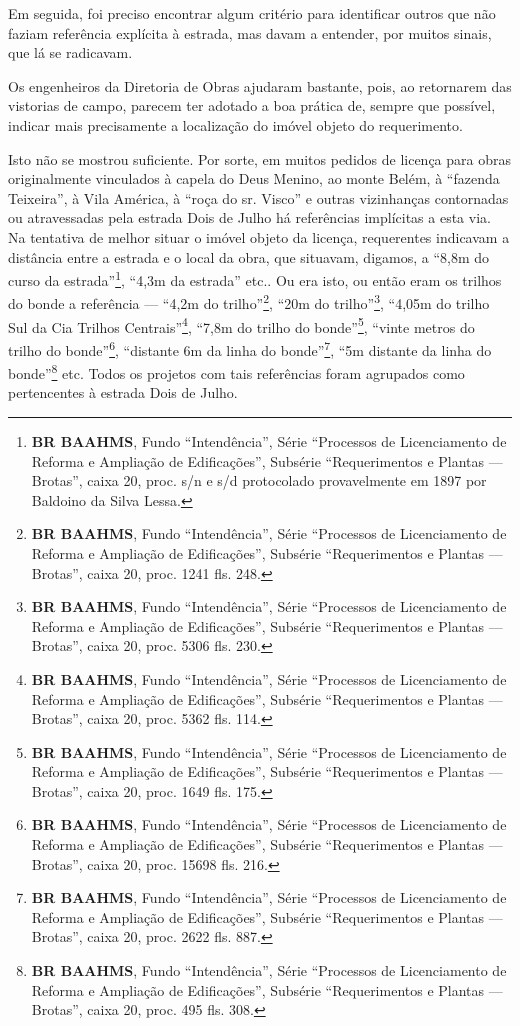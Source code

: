 Em seguida, foi preciso encontrar algum critério para identificar outros que não faziam referência explícita à estrada, mas davam a entender, por muitos sinais, que lá se radicavam. 

Os engenheiros da Diretoria de Obras ajudaram bastante, pois, ao retornarem das vistorias de campo, parecem ter adotado a boa prática de, sempre que possível, indicar mais precisamente a localização do imóvel objeto do requerimento. 

Isto não se mostrou suficiente. Por sorte, em muitos pedidos de licença para obras originalmente vinculados à capela do Deus Menino, ao monte Belém, à ``fazenda Teixeira'', à Vila América, à ``roça do sr. Visco'' e outras vizinhanças contornadas ou atravessadas pela estrada Dois de Julho há referências implícitas a esta via. Na tentativa de melhor situar o imóvel objeto da licença, requerentes indicavam a distância entre a estrada e o local da obra, que situavam, digamos, a ``8,8m do curso da estrada''\footnote{\textbf{BR BAAHMS}, Fundo ``Intendência'', Série ``Processos de Licenciamento de Reforma e Ampliação de Edificações'', Subsérie ``Requerimentos e Plantas --- Brotas'', caixa 20, proc. s/n e s/d protocolado provavelmente em 1897 por Baldoino da Silva Lessa.}, ``4,3m da estrada'' etc.. Ou era isto, ou então eram os trilhos do bonde a referência --- ``4,2m do trilho''\footnote{\textbf{BR BAAHMS}, Fundo ``Intendência'', Série ``Processos de Licenciamento de Reforma e Ampliação de Edificações'', Subsérie ``Requerimentos e Plantas --- Brotas'', caixa 20, proc. 1241 fls. 248.}, ``20m do trilho''\footnote{\textbf{BR BAAHMS}, Fundo ``Intendência'', Série ``Processos de Licenciamento de Reforma e Ampliação de Edificações'', Subsérie ``Requerimentos e Plantas --- Brotas'', caixa 20, proc. 5306 fls. 230.}, ``4,05m do trilho Sul da Cia Trilhos Centrais''\footnote{\textbf{BR BAAHMS}, Fundo ``Intendência'', Série ``Processos de Licenciamento de Reforma e Ampliação de Edificações'', Subsérie ``Requerimentos e Plantas --- Brotas'', caixa 20, proc. 5362 fls. 114.}, ``7,8m do trilho do bonde''\footnote{\textbf{BR BAAHMS}, Fundo ``Intendência'', Série ``Processos de Licenciamento de Reforma e Ampliação de Edificações'', Subsérie ``Requerimentos e Plantas --- Brotas'', caixa 20, proc. 1649 fls. 175.}, ``vinte metros do trilho do bonde''\footnote{\textbf{BR BAAHMS}, Fundo ``Intendência'', Série ``Processos de Licenciamento de Reforma e Ampliação de Edificações'', Subsérie ``Requerimentos e Plantas --- Brotas'', caixa 20, proc. 15698 fls. 216.}, ``distante 6m da linha do bonde''\footnote{\textbf{BR BAAHMS}, Fundo ``Intendência'', Série ``Processos de Licenciamento de Reforma e Ampliação de Edificações'', Subsérie ``Requerimentos e Plantas --- Brotas'', caixa 20, proc. 2622 fls. 887.}, ``5m distante da linha do bonde''\footnote{\textbf{BR BAAHMS}, Fundo ``Intendência'', Série ``Processos de Licenciamento de Reforma e Ampliação de Edificações'', Subsérie ``Requerimentos e Plantas --- Brotas'', caixa 20, proc. 495 fls. 308.} etc. Todos os projetos com tais referências foram agrupados como pertencentes à estrada Dois de Julho. 

